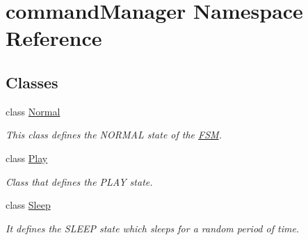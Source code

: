 \hypertarget{namespacecommandManager}{}\section{command\+Manager Namespace Reference}
\label{namespacecommandManager}
\subsection*{Classes}
\begin{DoxyCompactItemize}
\item 
class \hyperlink{classcommandManager_1_1Normal}{Normal}
\begin{DoxyCompactList}\small\item\em This class defines the N\+O\+R\+M\+AL state of the \hyperlink{namespaceFSM}{F\+SM}. \end{DoxyCompactList}\item 
class \hyperlink{classcommandManager_1_1Play}{Play}
\begin{DoxyCompactList}\small\item\em Class that defines the P\+L\+AY state. \end{DoxyCompactList}\item 
class \hyperlink{classcommandManager_1_1Sleep}{Sleep}
\begin{DoxyCompactList}\small\item\em It defines the S\+L\+E\+EP state which sleeps for a random period of time. \end{DoxyCompactList}\end{DoxyCompactItemize}

